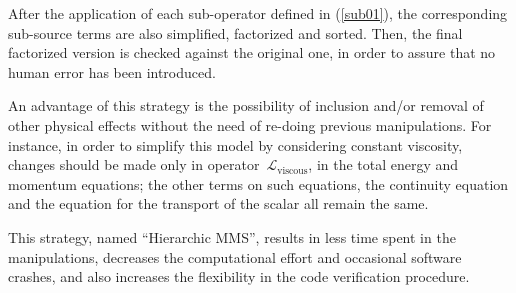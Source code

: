 \documentclass[10pt]{article}
\newcommand{\Lo}{\,\mathcal{L}}
\newcommand{\viscous}{\text{viscous}}
\begin{document}
After the application of each sub-operator defined in (\ref{sub01}), the corresponding sub-source terms are also simplified, factorized and sorted. Then, the final factorized version is checked against the original one, in order to assure that no human error has been introduced.

An advantage of this strategy is the possibility of inclusion and/or removal of other physical effects without the need of re-doing previous manipulations. For instance, in order to simplify this model by considering constant viscosity, changes should be made only in operator  $\Lo_{\viscous}$, in the total energy and momentum equations; the other terms on such equations, the continuity equation and the equation for the transport of the scalar all remain the same. 

This strategy, named ``Hierarchic MMS'', results in less time spent in the manipulations, decreases the computational effort and occasional software crashes, and also increases the flexibility in the code verification procedure.
\end{document}
